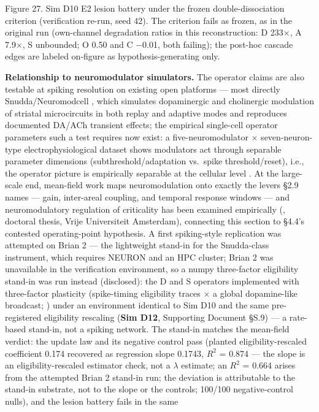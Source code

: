 \documentclass[
]{article}
\begin{document}
Figure 27. Sim D10 E2 lesion battery under the frozen
double-dissociation criterion (verification re-run, seed 42). The
criterion fails as frozen, as in the original run (own-channel
degradation ratios in this reconstruction: D {233×}, A {7.9×}, S
unbounded; O 0.50 and C {−0.01}, both failing); the post-hoc cascade
edges are labeled on-figure as hypothesis-generating only.

\textbf{Relationship to neuromodulator simulators.} The operator claims
are also testable at spiking resolution on existing open platforms ---
most directly Snudda/Neuromodcell , which simulates dopaminergic and
cholinergic modulation of striatal microcircuits in both replay and
adaptive modes and reproduces documented DA/ACh transient effects; the
empirical single-cell operator parameters such a test requires now
exist: a five-neuromodulator \(\times\) seven-neuron-type
electrophysiological dataset shows modulators act through separable
parameter dimensions (subthreshold/adaptation vs.~spike
threshold/reset), i.e., the operator picture is empirically separable at
the cellular level . At the large-scale end, mean-field work maps
neuromodulation onto exactly the levers §2.9 names --- gain, inter-areal
coupling, and temporal response windows --- and neuromodulatory
regulation of criticality has been examined empirically (, doctoral
thesis, Vrije Universiteit Amsterdam), connecting this section to §4.4's
contested operating-point hypothesis. A first spiking-style replication
was attempted on Brian 2 --- the lightweight stand-in for the
Snudda-class instrument, which requires NEURON and an HPC cluster; Brian
2 was unavailable in the verification environment, so a numpy
three-factor eligibility stand-in was run instead (disclosed): the D and
S operators implemented with three-factor plasticity (spike-timing
eligibility traces \(\times\) a global dopamine-like broadcast; ) under
an environment identical to Sim D10 and the same pre-registered
eligibility rescaling (\textbf{Sim D12}, Supporting Document §S.9) --- a
rate-based stand-in, not a spiking network. The stand-in matches the
mean-field verdict: the update law and its negative control pass
(planted eligibility-rescaled coefficient 0.174 recovered as regression
slope 0.1743, \(R^{2}\) = 0.874 --- the slope is an eligibility-rescaled
estimator check, not a \(\lambda\) estimate; an \(R^{2}\) = 0.664 arises
from the attempted Brian 2 stand-in run; the deviation is attributable
to the stand-in substrate, not to the slope or the controls; 100/100
negative-control nulls), and the lesion battery fails in the same
\end{document}
